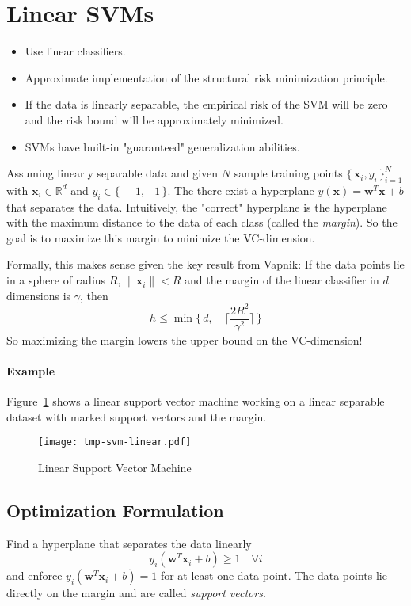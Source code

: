 \documentclass[a4paper, 11pt, accentcolor = tud3b]{tudreport}
\newcommand{\R}{\ensuremath{\mathbb{R}}}
\renewcommand{\vec}[1]{\mathbf{#1}}
\begin{document}
		\section{Linear SVMs}
			\begin{itemize}
				\item Use linear classifiers.
				\item Approximate implementation of the structural risk minimization principle.
				\item If the data is linearly separable, the empirical risk of the SVM will be zero and the risk bound will be approximately minimized.
				\item SVMs have built-in "guaranteed" generalization abilities.
			\end{itemize}
		
			Assuming linearly separable data and given \(N\) sample training points \( \{\, \vec{x}_i, y_i \,\}_{i = 1}^N \) with \( \vec{x}_i \in \R^d \) and \( y_i \in \{\, -1, +1 \,\} \). The there exist a hyperplane \( y(\vec{x}) = \vec{w}^T \vec{x} + b \) that separates the data. Intuitively, the "correct" hyperplane is the hyperplane with the maximum distance to the data of each class (called the \emph{margin}). So the goal is to maximize this margin to minimize the VC-dimension.
			
			Formally, this makes sense given the key result from Vapnik: If the data points lie in a sphere of radius \(R\), \( \lVert \vec{x}_i \rVert < R \) and the margin of the linear classifier in \(d\) dimensions is \(\gamma\), then
			\begin{equation}
				h \leq \min\Bigg\{\, d, \quad \bigg\lceil \frac{2R^2}{\gamma^2} \bigg\rceil \,\Bigg\}
			\end{equation}
			So maximizing the margin lowers the upper bound on the VC-dimension!
			
			\paragraph{Example}
				Figure~\ref{fig:svm} shows a linear support vector machine working on a linear separable dataset with marked support vectors and the margin.
				
				\begin{figure}
					\centering
					\texttt{[image: tmp-svm-linear.pdf]}
					\caption{Linear Support Vector Machine}
					\label{fig:svm}
				\end{figure}

			\subsection{Optimization Formulation}
				Find a hyperplane that separates the data linearly
				\begin{equation}
					y_i (\vec{w}^T \vec{x}_i + b) \geq 1 \quad\forall i
				\end{equation}
				and enforce \( y_i (\vec{w}^T \vec{x}_i + b) = 1 \) for at least one data point. The data points lie directly on the margin and are called \emph{support vectors}.
				
\end{document}
